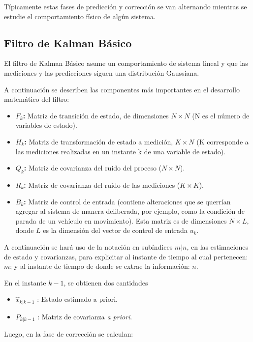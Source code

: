 T\'ipicamente estas fases de predicci\'on y correcci\'on se van alternando mientras se estudie el comportamiento f\'isico de alg\'un sistema.
\bigskip

\subsection{Filtro de Kalman B\'asico}
El filtro de Kalman B\'asico asume un comportamiento de sistema lineal y que las mediciones y las predicciones siguen una distribuci\'on Gaussiana. 
\bigskip

A continuaci\'on se describen las componentes m\'as importantes en el desarrollo matem\'atico del filtro:

\begin{itemize}
\item \textbf{$F_k$:} Matriz de transici\'on de estado, de dimensiones $N\times N$ (N es el n\'umero de variables de estado).
\item \textbf{$H_k$:} Matriz de transformaci\'on de estado a medici\'on, $K\times N$ (K corresponde a las mediciones realizadas en un instante k de una variable de estado).
\item \textbf{$Q_k$:} Matriz de covarianza del ruido del proceso ($N\times N$).
\item \textbf{$R_k$:} Matriz de covarianza del ruido de las mediciones ($K\times K$).
\item \textbf{$B_k$:} Matriz de control de entrada (contiene alteraciones que se querr\'ian agregar al sistema de manera deliberada, por ejemplo, como la condici\'on de parada de un veh\'iculo en movimiento). Esta matriz es de dimensiones $N\times L$, donde $L$ es la dimensi\'on del vector de control de entrada $u_k$.
\end{itemize}
\bigskip
A continuaci\'on se har\'a uso de la notaci\'on en sub\'indices $m|n$, en las estimaciones de estado y covarianzas, para explicitar al instante de tiempo al cual pertenecen:  $m$; y al instante de tiempo de donde se extrae la informaci\'on: $n$.
\bigskip

En el instante $k-1$, se obtienen dos cantidades 
\begin{itemize}
\item $\hat{x}_{k|k-1}$ : Estado estimado a priori.
\item $P_{k|k-1}$ : Matriz de covarianza \textit{a priori}.
\end{itemize}
\bigskip

Luego, en la fase de correcci\'on se calculan:

